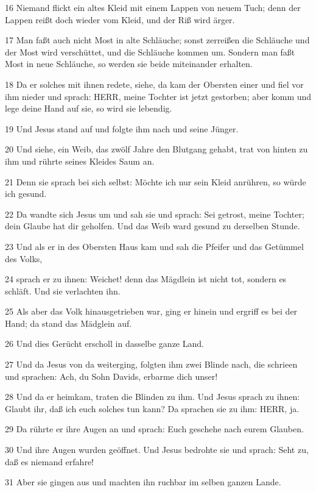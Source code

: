 \par 16 Niemand flickt ein altes Kleid mit einem Lappen von neuem Tuch; denn der Lappen reißt doch wieder vom Kleid, und der Riß wird ärger.
\par 17 Man faßt auch nicht Most in alte Schläuche; sonst zerreißen die Schläuche und der Most wird verschüttet, und die Schläuche kommen um. Sondern man faßt Most in neue Schläuche, so werden sie beide miteinander erhalten.
\par 18 Da er solches mit ihnen redete, siehe, da kam der Obersten einer und fiel vor ihm nieder und sprach: HERR, meine Tochter ist jetzt gestorben; aber komm und lege deine Hand auf sie, so wird sie lebendig.
\par 19 Und Jesus stand auf und folgte ihm nach und seine Jünger.
\par 20 Und siehe, ein Weib, das zwölf Jahre den Blutgang gehabt, trat von hinten zu ihm und rührte seines Kleides Saum an.
\par 21 Denn sie sprach bei sich selbst: Möchte ich nur sein Kleid anrühren, so würde ich gesund.
\par 22 Da wandte sich Jesus um und sah sie und sprach: Sei getrost, meine Tochter; dein Glaube hat dir geholfen. Und das Weib ward gesund zu derselben Stunde.
\par 23 Und als er in des Obersten Haus kam und sah die Pfeifer und das Getümmel des Volks,
\par 24 sprach er zu ihnen: Weichet! denn das Mägdlein ist nicht tot, sondern es schläft. Und sie verlachten ihn.
\par 25 Als aber das Volk hinausgetrieben war, ging er hinein und ergriff es bei der Hand; da stand das Mädglein auf.
\par 26 Und dies Gerücht erscholl in dasselbe ganze Land.
\par 27 Und da Jesus von da weiterging, folgten ihm zwei Blinde nach, die schrieen und sprachen: Ach, du Sohn Davids, erbarme dich unser!
\par 28 Und da er heimkam, traten die Blinden zu ihm. Und Jesus sprach zu ihnen: Glaubt ihr, daß ich euch solches tun kann? Da sprachen sie zu ihm: HERR, ja.
\par 29 Da rührte er ihre Augen an und sprach: Euch geschehe nach eurem Glauben.
\par 30 Und ihre Augen wurden geöffnet. Und Jesus bedrohte sie und sprach: Seht zu, daß es niemand erfahre!
\par 31 Aber sie gingen aus und machten ihn ruchbar im selben ganzen Lande.
